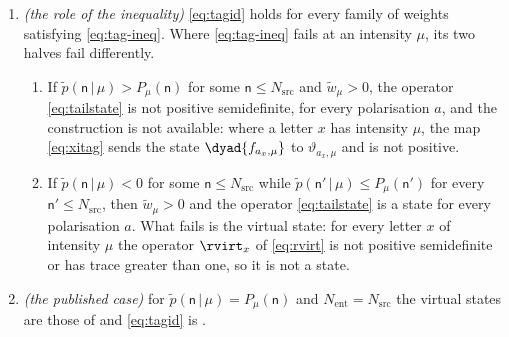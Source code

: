 \begin{proposition}
\begin{enumerate}[label=(\roman*),leftmargin=2.2em]
\begin{equation}
\begin{aligned}
    \bra{f_{a,\mu}}\zeta\ket{f_{a,\mu}}\,\vartheta_{a,\mu} ,
\end{aligned}
\end{equation}
in which $\Pi^{\mathrm v}_{\mathsf{n}}$ projects $\Hs{\Avirt}$ onto the quantum
sector $S_{\mathsf{n}}$, $V_{\mathsf{n}}$ is the isometry that embeds that
sector into the Fock space as $\operatorname{span}\{\ket{\mathsf{n},a}\}_a$,
and every sum runs over the sectors of the declared index set $\mathbb{T}$
only, is a channel from $\Avirt$ to the Fock space, and
\begin{equation}\label{eq:tagid}
  \Xi_{\mathrm{tag}}(\rvirt_x)=\rho_x\qquad\text{for every label }x .
\end{equation}
A quantum sector or a polarisation flag that no letter puts weight on is not a
sector of $\Avirt$ by Definition~\ref{def:tagged-source}\,(T3) and contributes
no term to \eqref{eq:xitag}, exactly as for the tail flags.
The channel $\Xi_{\mathrm{tag}}$ depends on the declared weights and the
cutoffs and on no label.
\item \emph{(the role of the inequality)} \eqref{eq:tagid} holds for every
family of weights satisfying \eqref{eq:tag-ineq}. Where \eqref{eq:tag-ineq}
fails at an intensity $\mu$, its two halves fail differently.
\begin{enumerate}[label=(\alph*),leftmargin=2.2em]
\item If $\tilde p(\mathsf{n}\,|\,\mu)>P_\mu(\mathsf{n})$ for some
$\mathsf{n}\le N_{\mathrm{src}}$ and $\tilde w_\mu>0$, the operator
\eqref{eq:tailstate} is not positive semidefinite, for every polarisation $a$,
and the construction is not available: where a letter $x$ has intensity $\mu$,
the map \eqref{eq:xitag} sends the state $\dyad{f_{a_x,\mu}}$ to
$\vartheta_{a_x,\mu}$ and is not positive.
\item If $\tilde p(\mathsf{n}\,|\,\mu)<0$ for some
$\mathsf{n}\le N_{\mathrm{src}}$ while
$\tilde p(\mathsf{n}'\,|\,\mu)\le P_\mu(\mathsf{n}')$ for every
$\mathsf{n}'\le N_{\mathrm{src}}$, then $\tilde w_\mu>0$ and the operator
\eqref{eq:tailstate} is a state for every polarisation $a$. What fails is the
virtual state: for every letter $x$ of intensity $\mu$ the operator $\rvirt_x$
of \eqref{eq:rvirt} is not positive semidefinite or has trace greater than
one, so it is not a state.
\end{enumerate}
\item \emph{(the published case)} for
$\tilde p(\mathsf{n}\,|\,\mu)=P_\mu(\mathsf{n})$ and
$N_{\mathrm{ent}}=N_{\mathrm{src}}$ the virtual states are those of
\cite[Eq.~(145)]{tupkary2026decoy} and \eqref{eq:tagid} is
\cite[Lemma~9.2]{tupkary2026decoy}.
\end{enumerate}
\end{proposition}

